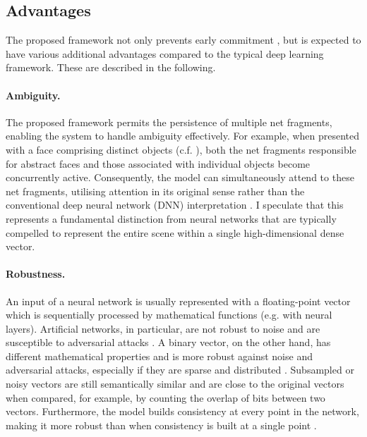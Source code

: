 \subsection{Advantages}
The proposed framework not only prevents early commitment , but is expected to have various additional advantages compared to the typical deep learning framework. These are described in the following.

\paragraph{Ambiguity.} The proposed framework permits the persistence of multiple net fragments, enabling the system to handle ambiguity effectively. For example, when presented with a face comprising distinct objects (c.f. ), both the net fragments responsible for abstract faces and those associated with individual objects become concurrently active. Consequently, the model can simultaneously attend to these net fragments, utilising attention in its original sense rather than the conventional deep neural network (DNN) interpretation . I speculate that this represents a fundamental distinction from neural networks that are typically compelled to represent the entire scene within a single high-dimensional dense vector.

\paragraph{Robustness.} An input of a neural network is usually represented with a floating-point vector which is sequentially processed by mathematical functions (e.g. with neural layers). Artificial networks, in particular, are not robust to noise and are susceptible to adversarial attacks . A binary vector, on the other hand, has different mathematical properties and is more robust against noise and adversarial attacks, especially if they are sparse and distributed .
Subsampled or noisy vectors are still semantically similar and are close to the original vectors when compared, for example, by counting the overlap of bits between two vectors.
Furthermore, the model builds consistency at every point in the network, making it more robust than when consistency is built at a single point .

